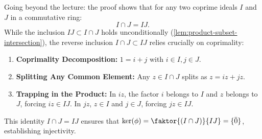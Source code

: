 \begin{content}
\begin{steps}
Going beyond the lecture: the proof shows that for any two coprime ideals $I$ and $J$ in a commutative ring:
\[
I \cap J = I J.
\]
While the inclusion $I J \subset I \cap J$ holds unconditionally (\cref{lem:product-subset-intersection}), the reverse inclusion $I \cap J \subset I J$ relies crucially on coprimality:
\begin{enumerate}[label=\textbf{(\arabic*)}]
    \setcounter{enumi}{0} \item \textbf{Coprimality Decomposition:} $1 = i + j$ with $i \in I, j \in J$.
    \setcounter{enumi}{1} \item \textbf{Splitting Any Common Element:} Any $z \in I \cap J$ splits as $z = i z + j z$.
    \item \textbf{Trapping in the Product:} In $i z$, the factor $i$ belongs to $I$ and $z$ belongs to $J$, forcing $i z \in I J$. In $j z$, $z \in I$ and $j \in J$, forcing $j z \in I J$.
\end{enumerate}
This identity $I \cap J = I J$ ensures that $\ker(\phi) = \faktor{(I \cap J)}{IJ} = \{ \bar{0} \}$, establishing injectivity.
\end{steps}
\end{content}

